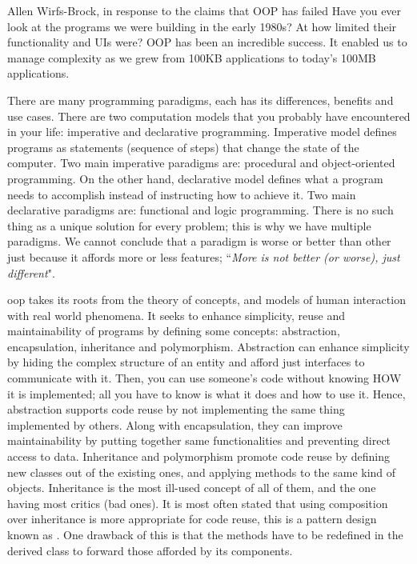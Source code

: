 \documentclass[12pt]{KodeBookAr}
\begin{document}
\begin{kodequote}{Allen Wirfs-Brock, in response to the claims that OOP has failed}
	Have you ever look at the programs we were building in the early 1980s? At how limited their functionality and UIs were? OOP has been an incredible success. It enabled us to manage complexity as we grew from 100KB applications to today’s 100MB applications.
\end{kodequote}

\begin{discussion}

There are many programming paradigms, each has its differences, benefits and use cases. 
There are two computation models that you probably have encountered in your life: imperative and declarative programming. 
Imperative model defines programs as statements (sequence of steps) that change the state of the computer. 
Two main imperative paradigms are: procedural and object-oriented programming. 
On the other hand, declarative model defines what a program needs to accomplish instead of instructing how to achieve it. 
Two main declarative paradigms are: functional and logic programming.
There is no such thing as a unique solution for every problem; this is why we have multiple paradigms. 
We cannot conclude that a paradigm is worse or better than other just because it affords more or less features; ``\textit{More is not better (or worse), just different}"\citep{2004-vanroy-haridi}.

\ac{oop} takes its roots from the theory of concepts, and models of human interaction with real world phenomena. 
It seeks to enhance simplicity, reuse and maintainability of programs by defining some concepts: abstraction, encapsulation, inheritance and polymorphism.
Abstraction can enhance simplicity by hiding the complex structure of an entity and afford just interfaces to communicate with it. 
Then, you can use someone's code without knowing HOW it is implemented; all you have to know is what it does and how to use it. 
Hence, abstraction supports code reuse by not implementing the same thing implemented by others. 
Along with encapsulation, they can improve maintainability by putting together same functionalities and preventing direct access to data. 
Inheritance and polymorphism promote code reuse by defining new classes out of the existing ones, and applying methods to the same kind of objects. 
Inheritance is the most ill-used concept of all of them, and the one having most critics (bad ones). 
It is most often stated that using composition over inheritance is more appropriate for code reuse, this is a pattern design known as  \citep{2002-knoernschild}.
One drawback of this is that the methods have to be redefined in the derived class to forward those afforded by its components.

\end{discussion}


\ifx\wholebook\relax\else
% 
% 
	
\end{document}
